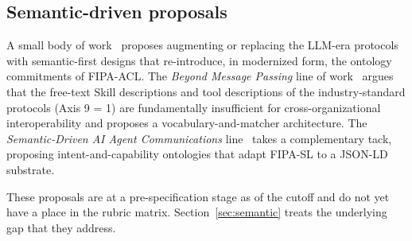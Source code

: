 \subsection{Semantic-driven proposals}
\label{sec:emerging:semantic}

A small body of work~\cite{semantic_driven,
beyond_message_passing} proposes augmenting or replacing
the LLM-era protocols with semantic-first designs that
re-introduce, in modernized form, the ontology commitments
of FIPA-ACL. The \emph{Beyond Message Passing} line of
work~\cite{beyond_message_passing} argues that the
free-text Skill descriptions and tool descriptions of the
industry-standard protocols (Axis 9 = 1) are
fundamentally insufficient for cross-organizational
interoperability and proposes a vocabulary-and-matcher
architecture. The \emph{Semantic-Driven AI Agent
Communications} line~\cite{semantic_driven} takes a
complementary tack, proposing intent-and-capability
ontologies that adapt FIPA-SL to a JSON-LD substrate.

These proposals are at a pre-specification stage as of
the cutoff and do not yet have a place in the rubric
matrix. Section~\ref{sec:semantic} treats the underlying
gap that they address.
